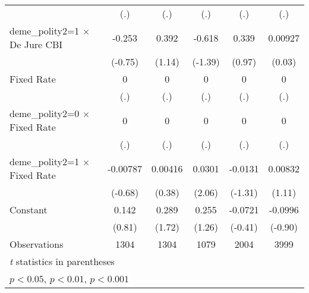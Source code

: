\begin{table}[htbp]
\begin{tabular}{l*{5}{c}}
                                        &      (.)         &      (.)         &      (.)         &      (.)         &      (.)         \\
\addlinespace
deme\_polity2=1 $\times$ De Jure CBI     &   -0.253         &    0.392         &   -0.618         &    0.339         &  0.00927         \\
                                        &  (-0.75)         &   (1.14)         &  (-1.39)         &   (0.97)         &   (0.03)         \\
\addlinespace
Fixed Rate                              &        0         &        0         &        0         &        0         &        0         \\
                                        &      (.)         &      (.)         &      (.)         &      (.)         &      (.)         \\
\addlinespace
deme\_polity2=0 $\times$ Fixed Rate      &        0         &        0         &        0         &        0         &        0         \\
                                        &      (.)         &      (.)         &      (.)         &      (.)         &      (.)         \\
\addlinespace
deme\_polity2=1 $\times$ Fixed Rate      & -0.00787         &  0.00416         &   0.0301\sym{*}  &  -0.0131         &  0.00832         \\
                                        &  (-0.68)         &   (0.38)         &   (2.06)         &  (-1.31)         &   (1.11)         \\
\addlinespace
Constant                                &    0.142         &    0.289         &    0.255         &  -0.0721         &  -0.0996         \\
                                        &   (0.81)         &   (1.72)         &   (1.26)         &  (-0.41)         &  (-0.90)         \\
\midrule
Observations                            &     1304         &     1304         &     1079         &     2004         &     3999         \\
\bottomrule
\multicolumn{6}{l}{\footnotesize \textit{t} statistics in parentheses}\\
\multicolumn{6}{l}{\footnotesize \sym{*} \(p<0.05\), \sym{**} \(p<0.01\), \sym{***} \(p<0.001\)}\\
\end{tabular}
\end{table}
